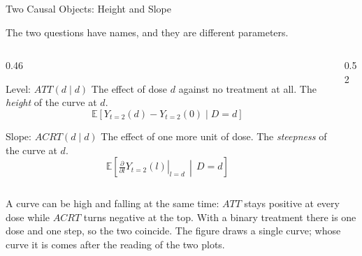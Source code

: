\documentclass[main.tex]{subfiles}
\begin{document}
\begin{frame}{Two Causal Objects: Height and Slope}

  The two questions have names, and they are different parameters.

  \medskip
  \begin{columns}[T]
    \begin{column}{0.46\textwidth}
      \begin{block}{Level: $ATT(d\mid d)$}
        \footnotesize
        The effect of dose $d$ against no treatment at all. The
        \emph{height} of the curve at $d$.
        \[ \mathbb{E}\!\left[Y_{t=2}(d)-Y_{t=2}(0)\mid D=d\right] \]
      \end{block}

      \smallskip
      \begin{block}{Slope: $ACRT(d\mid d)$}
        \footnotesize
        The effect of one more unit of dose. The \emph{steepness} of the curve at
        $d$.
        \[ \mathbb{E}\!\left[\left.\tfrac{\partial}{\partial l} Y_{t=2}(l)\right|_{l=d}
           \,\middle|\, D=d\right] \]
      \end{block}
    \end{column}
    \begin{column}{0.52\textwidth}
      \centering
    \end{column}
  \end{columns}

  \medskip
  A curve can be high and falling at the same time: $ATT$ stays positive at
  every dose while $ACRT$ turns negative at the top. With a binary treatment
  there is one dose and one step, so the two coincide. The figure draws a single
  curve; whose curve it is comes after the reading of the two plots.

\end{frame}
\end{document}
